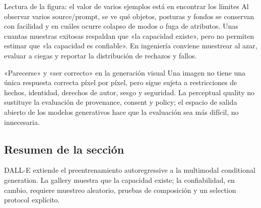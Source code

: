 
\begin{knowledgebox}{Lectura de la figura: el valor de varios ejemplos está en encontrar los límites}
Al observar varios source/prompt, se ve qué objetos, posturas y fondos se conservan con facilidad y en cuáles ocurre colapso de modos o fuga de atributos. Unas cuantas muestras exitosas respaldan que «la capacidad existe», pero no permiten estimar que «la capacidad es confiable». En ingeniería conviene muestrear al azar, evaluar a ciegas y reportar la distribución de rechazos y fallos.
\end{knowledgebox}

\begin{warningbox}{«Parecerse» y «ser correcto» en la generación visual}
Una imagen no tiene una única respuesta correcta píxel por píxel, pero sigue sujeta a restricciones de hechos, identidad, derechos de autor, sesgo y seguridad. La perceptual quality no sustituye la evaluación de provenance, consent y policy; el espacio de salida abierto de los modelos generativos hace que la evaluación sea más difícil, no innecesaria.
\end{warningbox}

\subsection{Resumen de la sección}

DALL-E extiende el preentrenamiento autoregressive a la multimodal conditional generation. La gallery muestra que la capacidad existe; la confiabilidad, en cambio, requiere muestreo aleatorio, pruebas de composición y un selection protocol explícito.

